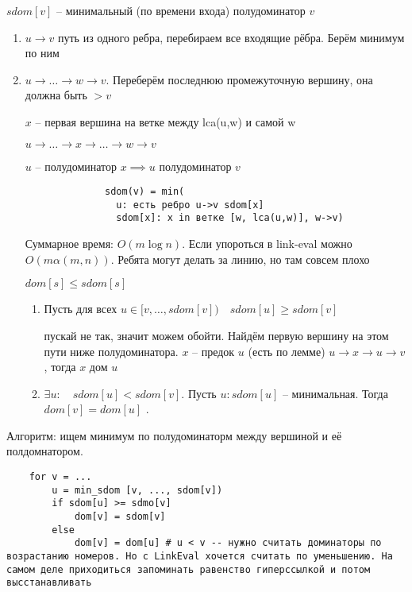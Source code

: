 \documentclass{book}
\theoremstyle{definition}
\begin{document}
$sdom[v]$ -- минимальный (по времени входа) полудоминатор  $v$

\begin{enumerate}
    \item $u\to v$ путь из одного ребра, перебираем все входящие рёбра. Берём минимум по ним
    \item $u\to \ldots\to w\to v$. Переберём последнюю промежуточную вершину, она должна быть $>v$

        $x$ -- первая вершина на ветке между lca(u,w) и самой w

         $u\to \ldots\to x\to \ldots\to w\to v$

         $u$ -- полудоминатор  $x \implies u$ полудоминатор $v$

          \begin{lstlisting}
              sdom(v) = min(
                u: есть ребро u->v sdom[x]
                sdom[x]: x in ветке [w, lca(u,w)], w->v)
          \end{lstlisting}          

          Суммарное время: $O\left( m\log n \right) $. Если упороться в link-eval можно $O\left( m \alpha(m,n) \right) $. Ребята могут делать за линию, но там совсем плохо

          $dom[s] \leqslant sdom[s]$

          \begin{enumerate}
              \item Пусть для всех $u\in [v, \ldots, sdom[v])\quad sdom[u] \geqslant  sdom[v]$

                  пускай не так, значит можем обойти. Найдём первую вершину на этом пути ниже полудоминатора. $x$ -- предок  $u$ (есть по лемме) $ u\to x\to u\to v$, тогда $x$ дом  $u$ 

              \item $\exists u:\quad sdom[u]<sdom[v]$. Пусть $u: sdom[u] $ -- минимальная. Тогда  $dom[v] = dom[u]$
          .\end{enumerate}

\end{enumerate}
Алгоритм: ищем минимум по полудоминаторм между вершиной и её полдомнатором.

\begin{lstlisting}
    for v = ...
        u = min_sdom [v, ..., sdom[v])
        if sdom[u] >= sdmo[v]
            dom[v] = sdom[v]
        else
            dom[v] = dom[u] # u < v -- нужно считать доминаторы по возрастанию номеров. Но с LinkEval хочется считать по уменьшению. На самом деле приходиться запоминать равенство гиперссылкой и потом высстанавливать
\end{lstlisting}
\end{document}
